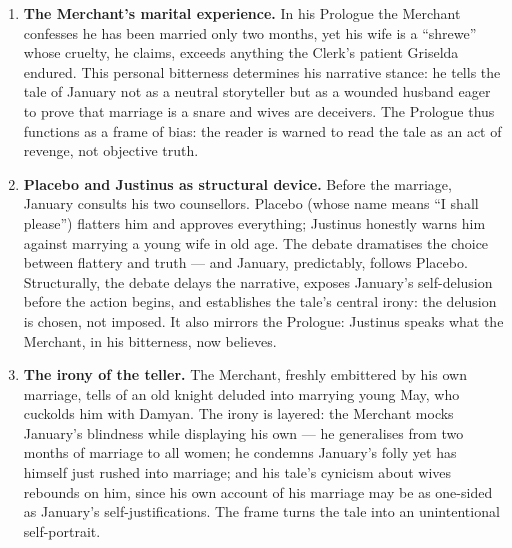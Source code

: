 \documentclass[11pt]{article}
\newcommand{\cle}[1]{{\popxbold\color{popdark}#1}}
\begin{document}
\begin{corrige}
\begin{enumerate}
\item \textbf{The Merchant's marital experience.} In his Prologue the Merchant confesses he has been married only two months, yet his wife is a ``shrewe'' whose cruelty, he claims, exceeds anything the Clerk's patient Griselda endured. This personal bitterness determines his \cle{narrative stance}: he tells the tale of January not as a neutral storyteller but as a wounded husband eager to prove that marriage is a snare and wives are deceivers. The Prologue thus functions as a frame of bias: the reader is warned to read the tale as an act of revenge, not objective truth.

\item \textbf{Placebo and Justinus as structural device.} Before the marriage, January consults his two counsellors. Placebo (whose name means ``I shall please'') flatters him and approves everything; Justinus honestly warns him against marrying a young wife in old age. The debate dramatises the choice between flattery and truth --- and January, predictably, follows Placebo. Structurally, the debate delays the narrative, exposes January's self-delusion before the action begins, and establishes the tale's central irony: the delusion is chosen, not imposed. It also mirrors the Prologue: Justinus speaks what the Merchant, in his bitterness, now believes.

\item \textbf{The irony of the teller.} The Merchant, freshly embittered by his own marriage, tells of an old knight deluded into marrying young May, who cuckolds him with Damyan. The irony is layered: the Merchant mocks January's blindness while displaying his own --- he generalises from two months of marriage to all women; he condemns January's folly yet has himself just rushed into marriage; and his tale's cynicism about wives rebounds on him, since his own account of his marriage may be as one-sided as January's self-justifications. The frame turns the tale into an unintentional self-portrait.
\end{enumerate}
\end{corrige}
\end{document}
